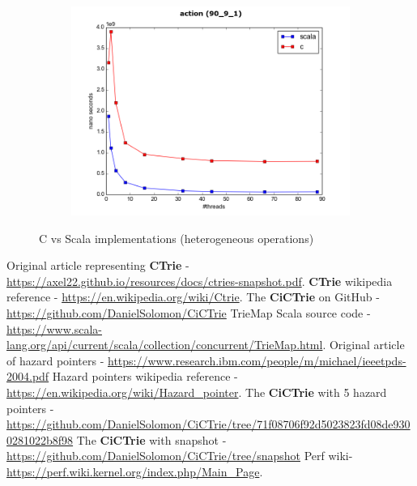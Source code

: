 \documentclass[conference]{IEEEtran}
\begin{document}
\begin{figure}
\begin{subfigure}{.5\textwidth}
			\includegraphics[width=0.45\paperwidth]{vs_scala/action_90_9_1.png}
			\label{fig:c_vs_scala_90_9_1}
		\end{subfigure}
		\caption{C vs Scala implementations (heterogeneous operations)}
		\label{fig:heterogeneous_operations}
	\end{figure}	


\begin{thebibliography}{1}
	 Original article representing \textbf{CTrie} - \url{https://axel22.github.io/resources/docs/ctries-snapshot.pdf}. 
	 \textbf{CTrie} wikipedia reference - \url{https://en.wikipedia.org/wiki/Ctrie}.
	 The \textbf{CiCTrie} on GitHub -
	\url{https://github.com/DanielSolomon/CiCTrie}
	 TrieMap Scala source code - \url{https://www.scala-lang.org/api/current/scala/collection/concurrent/TrieMap.html}.
	 Original article of hazard pointers - 
	\url{https://www.research.ibm.com/people/m/michael/ieeetpds-2004.pdf}
	 Hazard pointers wikipedia reference - \url{https://en.wikipedia.org/wiki/Hazard_pointer}.
	 The \textbf{CiCTrie} with 5 hazard pointers -
	\url{https://github.com/DanielSolomon/CiCTrie/tree/71f08706f92d5023823fd08de9300281022b8f98}
	 The \textbf{CiCTrie} with snapshot -
	\url{https://github.com/DanielSolomon/CiCTrie/tree/snapshot}
	 Perf wiki-  \url{https://perf.wiki.kernel.org/index.php/Main_Page}.
	
\end{thebibliography}

\end{document}
